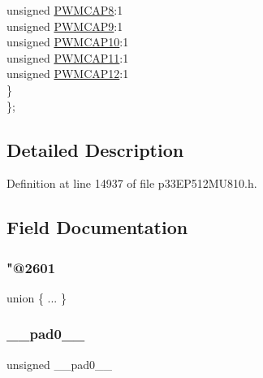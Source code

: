 \begin{DoxyCompactItemize}
\begin{tabbing}
\>\>unsigned \hyperlink{structtag_p_w_m_c_a_p4_b_i_t_s_a01b802d233dbea59cd23996d219e39c9}{PWMCAP8}:1\\
\>\>unsigned \hyperlink{structtag_p_w_m_c_a_p4_b_i_t_s_a9a0cd5d7a58681927adecfd9946b75fb}{PWMCAP9}:1\\
\>\>unsigned \hyperlink{structtag_p_w_m_c_a_p4_b_i_t_s_a765ff5b5b1008d8aeb0359590759bd42}{PWMCAP10}:1\\
\>\>unsigned \hyperlink{structtag_p_w_m_c_a_p4_b_i_t_s_a50c60306a98023b9bb8fac50c8d5e965}{PWMCAP11}:1\\
\>\>unsigned \hyperlink{structtag_p_w_m_c_a_p4_b_i_t_s_a8fec92523cf22c89f156a97aca44dcff}{PWMCAP12}:1\\
\>\} \\
\}; \\

\end{tabbing}\end{DoxyCompactItemize}


\subsection{Detailed Description}


Definition at line 14937 of file p33\+E\+P512\+M\+U810.\+h.



\subsection{Field Documentation}
\mbox{\label{structtag_p_w_m_c_a_p4_b_i_t_s_ae15048305c97c776c19e57dfb48d5720}} 
\subsubsection{\texorpdfstring{"@2601}{@2601}}
{\footnotesize\ttfamily union \{ ... \} }

\mbox{\label{structtag_p_w_m_c_a_p4_b_i_t_s_adf71f3d8410c1f1dbbc96680a92c49af}} 
\subsubsection{\texorpdfstring{\+\_\+\+\_\+pad0\+\_\+\+\_\+}{\_\_pad0\_\_}}
{\footnotesize\ttfamily unsigned \+\_\+\+\_\+pad0\+\_\+\+\_\+}



